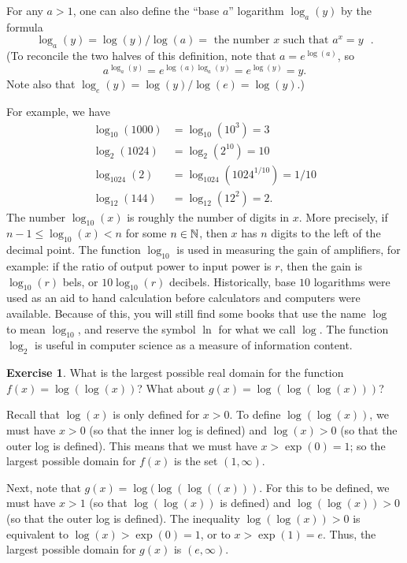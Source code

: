 \documentclass[a4paper]{book}
\theoremstyle{definition}
\newtheorem{exercise}[theorem]{Exercise}
\renewenvironment{solution}{\SolutionInline}{\endSolutionInline}
\begin{document}
For any $a>1$, one can also define the ``base $a$'' logarithm
$\log_a(y)$ by the formula
\[ \log_a(y) = \log(y)/\log(a) =
    \text{ the number $x$ such that $a^x=y$ }.
\]
(To reconcile the two halves of this definition, note that
$a=e^{\log(a)}$, so
\[ a^{\log_a(y)} = e^{\log(a)\log_a(y)} = e^{\log(y)} = y. \]
Note also that $\log_e(y)=\log(y)/\log(e)=\log(y)$.)

For example, we have
\begin{align*}
 \log_{10}(1000) &= \log_{10}(10^3) = 3 \\
 \log_2(1024)    &= \log_2(2^{10}) = 10 \\
 \log_{1024}(2)  &= \log_{1024}(1024^{1/10}) = 1/10 \\
 \log_{12}(144)  &= \log_{12}(12^2) = 2.
\end{align*}
The number $\log_{10}(x)$ is roughly the number of digits in $x$.
More precisely, if $n-1\leq\log_{10}(x)<n$ for some $n\in{\mathbb{N}}$, then $x$
has $n$ digits to the left of the decimal point.  The function
$\log_{10}$ is used in measuring the gain of amplifiers, for example:
if the ratio of output power to input power is $r$, then the gain is
$\log_{10}(r)$ bels, or $10\log_{10}(r)$ decibels.  Historically, base
$10$ logarithms were used as an aid to hand calculation before
calculators and computers were available.  Because of this, you will
still find some books that use the name $\log$ to mean $\log_{10}$,
and reserve the symbol $\ln$ for what we call $\log$.  The function
$\log_2$ is useful in computer science as a measure of information
content.

\begin{exercise}
 What is the largest possible real domain for the function
 $f(x)=\log(\log(x))$?  What about $g(x)=\log(\log(\log(x)))$?
\end{exercise}
\begin{solution}
 Recall that $\log(x)$ is only defined for $x>0$.  To define
 $\log(\log(x))$, we must have $x>0$ (so that the inner log is
 defined) and $\log(x)>0$ (so that the outer log is defined).  This
 means that we must have $x>\exp(0)=1$; so the largest possible domain
 for $f(x)$ is the set $(1,\infty)$.  
 
 Next, note that $g(x)=\log(\log(\log((x)))$.  For this to be defined,
 we must have $x>1$ (so that $\log(\log(x))$ is defined) and
 $\log(\log(x))>0$ (so that the outer log is defined).  The inequality
 $\log(\log(x))>0$ is equivalent to $\log(x)>\exp(0)=1$, or to
 $x>\exp(1)=e$.  Thus, the largest possible domain for $g(x)$ is
 $(e,\infty)$. 
\end{solution}
\end{document}
